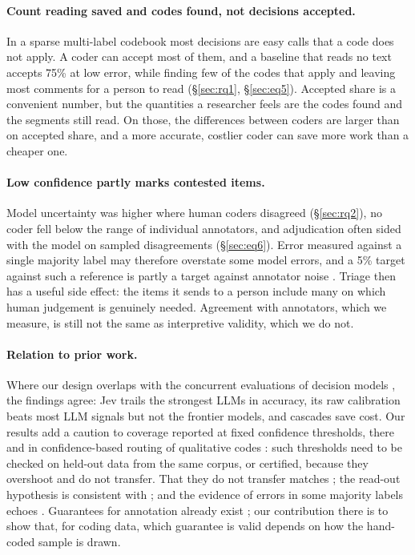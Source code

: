 \paragraph{Count reading saved and codes found, not decisions accepted.} In a sparse multi-label codebook most decisions are
easy calls that a code does not apply. A coder can accept most of them, and a baseline that reads no text accepts 75\% at low
error, while finding few of the codes that apply and leaving most comments for a person to read (\S\ref{sec:rq1},
\S\ref{sec:eq5}). Accepted share is a convenient number, but the quantities a researcher feels are the codes found and the
segments still read. On those, the differences between coders are larger than on accepted share, and a more accurate,
costlier coder can save more work than a cheaper one.

\paragraph{Low confidence partly marks contested items.} Model uncertainty was higher where human coders disagreed
(\S\ref{sec:rq2}), no coder fell below the range of individual annotators, and adjudication often sided with the model on
sampled disagreements (\S\ref{sec:eq6}). Error measured against a single majority label may therefore overstate some model
errors, and a 5\% target against such a reference is partly a target against annotator noise
\citep{plank2022problem,uma2021learning}. Triage then has a useful side effect: the items it sends to a person include many
on which human judgement is genuinely needed. Agreement with annotators, which we measure, is still not the same as
interpretive validity, which we do not.

\paragraph{Relation to prior work.} Where our design overlaps with the concurrent evaluations of decision models
\citep{ibrahim2026decision,sharma2026typedbench}, the findings agree: Jev trails the strongest LLMs in accuracy, its raw
calibration beats most LLM signals but not the frontier models, and cascades save cost. Our results add a caution to
coverage reported at fixed confidence thresholds, there and in confidence-based routing of qualitative codes
\citep{zhao2025confidence}: such thresholds need to be checked on held-out data from the same corpus, or certified, because
they overshoot and do not transfer. That they do not transfer matches \citet{lu2026candidate}; the read-out hypothesis is
consistent with \citet{li2026llmasjev}; and the evidence of errors in some majority labels echoes \citet{liu2026agreement}.
Guarantees for annotation already exist \citep{zeng2026hypac}; our contribution there is to show that, for coding data, which
guarantee is valid depends on how the hand-coded sample is drawn.

